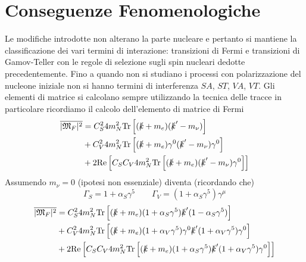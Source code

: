 \section{Conseguenze Fenomenologiche}
Le modifiche introdotte non alterano la parte nucleare e pertanto si mantiene la classificazione dei vari termini di interazione: transizioni di Fermi e transizioni di Gamov-Teller con le regole di selezione sugli spin nucleari dedotte precedentemente. Fino a quando non si studiano i processi con polarizzazione del nucleone iniziale non si hanno termini di interferenza $SA$, $ST$, $VA$, $VT$. Gli elementi di matrice si calcolano sempre utilizzando la tecnica delle tracce in particolare ricordiamo il calcolo dell'elemento di matrice di Fermi
$$
\begin{aligned}
	\overline{|\mathfrak{M}_F|^2} &= C_S^2 4m_N^2 \text{Tr}\left[(\slashed{k} + m_e)(\slashed{k}' - m_\nu)\right] \\
	&+ C_V^2 4m_N^2 \text{Tr}\left[(\slashed{k} + m_e)\gamma^0 (\slashed{k}' - m_\nu)\gamma^0\right] \\
	&+ 2 \text{Re}\left[C_S C_V 4m_N^2 \text{Tr}\left[(\slashed{k} + m_e)(\slashed{k}' - m_\nu)\gamma^0\right]\right]
\end{aligned}
$$
Assumendo $m_\nu=0$ (ipotesi non essenziale) diventa (ricordando che)
$$
\Gamma_S = 1 + \alpha_S \gamma^5 \qquad \Gamma_V = (1 + \alpha_S \gamma^5) \gamma^\mu
$$
$$
\begin{aligned}
	\overline{|\mathfrak{M}_F|^2} &= C_S^2 4m_N^2 \text{Tr}\left[(\slashed{k} + m_e)(1 + \alpha_S \gamma^5) \slashed{k}' (1 - \alpha_S \gamma^5)\right] \\
	&+ C_V^2 4m_N^2 \text{Tr}\left[(\slashed{k} + m_e)(1 + \alpha_V \gamma^5) \gamma^0 \slashed{k}' (1 + \alpha_V \gamma^5) \gamma^0\right] \\
	&+ 2 \text{Re}\left[C_S C_V 4m_N^2 \text{Tr}\left[(\slashed{k} + m_e)(1 + \alpha_S \gamma^5) \slashed{k}' (1 + \alpha_V \gamma^5) \gamma^0\right]\right]
\end{aligned}
$$
